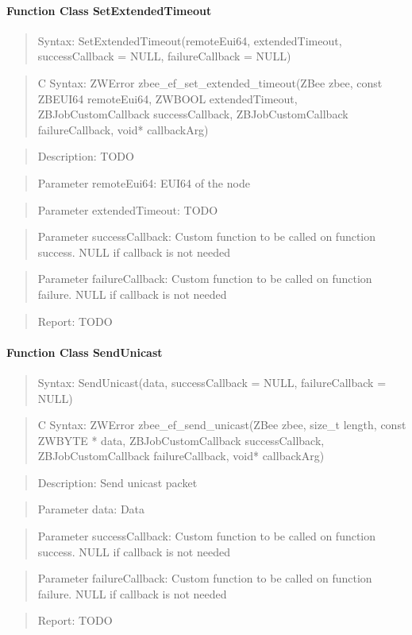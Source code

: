 \paragraph{Function Class SetExtendedTimeout}
\begin{quote}Syntax: SetExtendedTimeout(remoteEui64, extendedTimeout, successCallback = NULL, failureCallback = NULL)\end{quote}
\begin{quote}C Syntax: ZWError zbee\_ef\_set\_extended\_timeout(ZBee zbee, const ZBEUI64 remoteEui64, ZWBOOL extendedTimeout, ZBJobCustomCallback successCallback, ZBJobCustomCallback failureCallback, void* callbackArg)\end{quote}
\begin{quote}Description: TODO\end{quote}
\begin{quote}Parameter remoteEui64: EUI64 of the node\end{quote}
\begin{quote}Parameter extendedTimeout: TODO\end{quote}
\begin{quote}Parameter successCallback: Custom function to be called on function success. NULL if callback is not needed\end{quote}
\begin{quote}Parameter failureCallback: Custom function to be called on function failure. NULL if callback is not needed\end{quote}
\begin{quote}Report: TODO\end{quote}

\paragraph{Function Class SendUnicast}
\begin{quote}Syntax: SendUnicast(data, successCallback = NULL, failureCallback = NULL)\end{quote}
\begin{quote}C Syntax: ZWError zbee\_ef\_send\_unicast(ZBee zbee, size\_t length, const ZWBYTE * data, ZBJobCustomCallback successCallback, ZBJobCustomCallback failureCallback, void* callbackArg)\end{quote}
\begin{quote}Description: Send unicast packet\end{quote}
\begin{quote}Parameter data: Data\end{quote}
\begin{quote}Parameter successCallback: Custom function to be called on function success. NULL if callback is not needed\end{quote}
\begin{quote}Parameter failureCallback: Custom function to be called on function failure. NULL if callback is not needed\end{quote}
\begin{quote}Report: TODO\end{quote}

